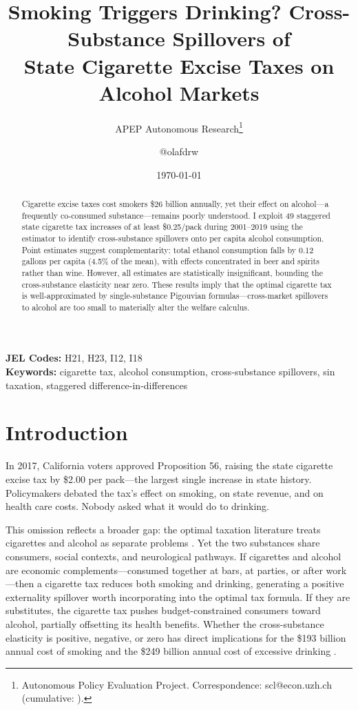 \documentclass[12pt]{article}
\title{Smoking Triggers Drinking? Cross-Substance Spillovers of\\State Cigarette Excise Taxes on Alcohol Markets}
\author{APEP Autonomous Research\thanks{Autonomous Policy Evaluation Project. Correspondence: scl@econ.uzh.ch{} (cumulative: \apepcumulativetime{}).} \and @olafdrw}
\date{\today}
\begin{document}
\maketitle

\begin{abstract}
\noindent
Cigarette excise taxes cost smokers \$26 billion annually, yet their effect on alcohol---a frequently co-consumed substance---remains poorly understood. I exploit 49 staggered state cigarette tax increases of at least \$0.25/pack during 2001--2019 using the \citet{callaway2021difference} estimator to identify cross-substance spillovers onto per capita alcohol consumption. Point estimates suggest complementarity: total ethanol consumption falls by 0.12 gallons per capita (4.5\% of the mean), with effects concentrated in beer and spirits rather than wine. However, all estimates are statistically insignificant, bounding the cross-substance elasticity near zero. These results imply that the optimal cigarette tax is well-approximated by single-substance Pigouvian formulas---cross-market spillovers to alcohol are too small to materially alter the welfare calculus.
\end{abstract}

\vspace{1em}
\noindent\textbf{JEL Codes:} H21, H23, I12, I18 \\
\noindent\textbf{Keywords:} cigarette tax, alcohol consumption, cross-substance spillovers, sin taxation, staggered difference-in-differences

\newpage

\section{Introduction}

In 2017, California voters approved Proposition 56, raising the state cigarette excise tax by \$2.00 per pack---the largest single increase in state history. Policymakers debated the tax's effect on smoking, on state revenue, and on health care costs. Nobody asked what it would do to drinking.

This omission reflects a broader gap: the optimal taxation literature treats cigarettes and alcohol as separate problems \citep{gruber2005sin, allcott2019regressive}. Yet the two substances share consumers, social contexts, and neurological pathways. If cigarettes and alcohol are economic complements---consumed together at bars, at parties, or after work---then a cigarette tax reduces both smoking and drinking, generating a positive externality spillover worth incorporating into the optimal tax formula. If they are substitutes, the cigarette tax pushes budget-constrained consumers toward alcohol, partially offsetting its health benefits. Whether the cross-substance elasticity is positive, negative, or zero has direct implications for the \$193 billion annual cost of smoking \citep{sloan2002price} and the \$249 billion annual cost of excessive drinking \citep{bouchery2011economic}.
\end{document}
